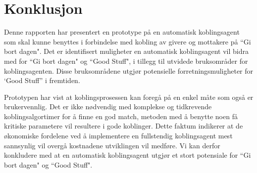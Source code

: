 \section{Konklusjon}

Denne rapporten har presentert en prototype på en automatisk koblingsagent som skal kunne benyttes i forbindelse med kobling av givere og mottakere på ``Gi bort dagen". Det er identifisert muligheter en automatisk koblingsagent vil bidra med for ``Gi bort dagen" og ``Good Stuff", i tillegg til utvidede bruksområder for koblingsagenten. Disse bruksområdene utgjør potensielle forretningsmuligheter for `Good Stuff” i fremtiden.

Prototypen har vist at koblingsprosessen kan foregå på en enkel måte som også er brukervennlig. Det er ikke nødvendig med komplekse og tidkrevende koblingsalgortimer for å finne en god match, metoden med å benytte noen få kritiske parametere vil resultere i gode koblinger. Dette faktum indikerer at de økonomiske fordelene ved å implementere en fullstendig koblingsagent mest sannsynlig vil overgå kostnadene utviklingen vil medføre. Vi kan derfor konkludere med at en automatisk koblingsagent utgjør et stort potensiale for ``Gi bort dagen" og ``Good Stuff". 
